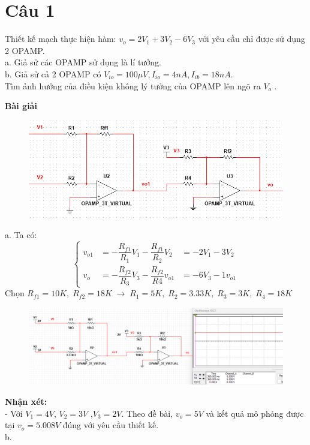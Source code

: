 \section{Câu 1}
Thiết kế mạch thực hiện hàm: $v_o = 2V_1 + 3V_2 -6V_3$ với yêu cầu chỉ được sử dụng 2 OPAMP.\\
a. Giả sử các OPAMP sử dụng là lí tưởng.\\
b. Giả sử cả 2 OPAMP có $V_{io}=100\mu V, I_{io}=4nA, I_{ib}=18nA$.\\
Tìm ảnh hưởng của điều kiện không lý tưởng của OPAMP lên ngõ ra $V_o$ .\\
\begin{center}
\textbf{Bài giải}
\end{center}
\begin{figure}[H]
	\centering
	\includegraphics[scale=0.9]{image/C1_a_BT.png}
\end{figure}
a. Ta có:
\[
\left\{
\begin{aligned}
v_{o1} &= -\dfrac{R_{f1}}{R_1}V_1 - \dfrac{R_{f1}}{R_2}V_2 &= -2V_1-3V_2\\
v_o &= -\dfrac{R_{f2}}{R_3}V_3 - \dfrac{R_{f2}}{R4}v_{o1} &= -6V_3-1v_{o1}
\end{aligned}
\right.
\]
Chọn $\boxed{R_{f1}=10K,\; R_{f2}=18K \;\rightarrow\; R_1=5K,\; R_2=3.33K,\; R_3=3K,\; R_4=18K}$
\begin{figure}[H]
	\centering
	\includegraphics[scale=0.5]{image/C1_simulate.png}
\end{figure}
\textbf{Nhận xét:}\\
- Với $V_1=4V$, $V_2=3V$ ,$V_3=2V$. Theo đề bài, $v_o=5V$ và kết quả mô phỏng được tại $v_o=5.008V$ đúng với yêu cầu thiết kế.\\

b.
